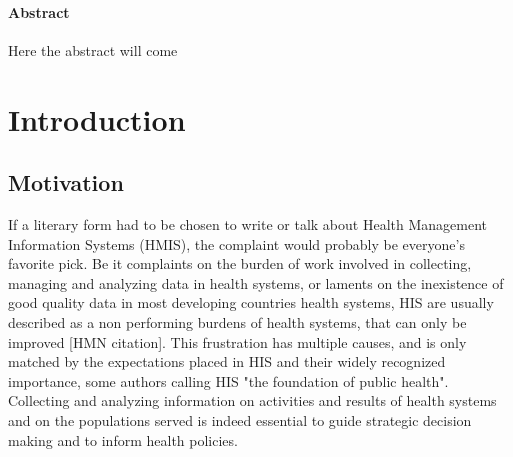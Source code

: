 \documentclass[a4paper,11pt,draft,twoside]{article}
\begin{document}
\newpage\null\thispagestyle{empty}\newpage







\thispagestyle{plain}
\setcounter{page}{1}



\paragraph{Abstract}

Here the abstract will come

\cleardoublepage
\tableofcontents
{}
\newpage
{}
\listoffigures
\newpage
{}
\listoftables

\thispagestyle{fancy}

\sloppy


\cleardoublepage
{}
\setcounter{page}{1}

\section{Introduction}

\subsection{Motivation}

If a literary form had to be chosen to write or talk about Health Management Information Systems (HMIS), the complaint would probably be everyone's favorite pick. Be it complaints on the burden of work involved in collecting, managing and analyzing data in health systems, or laments on the inexistence of good quality data in most developing countries health systems, HIS are usually described as a non performing burdens of health systems, that can only be improved [HMN citation]. This frustration has multiple causes, and is only matched by the expectations placed in HIS and their widely recognized importance, some authors calling HIS "the foundation of public health"\cite{foundph}. Collecting and analyzing information on activities and results of health systems and on the populations served is indeed essential to guide strategic decision making and to inform health policies.
\end{document}

